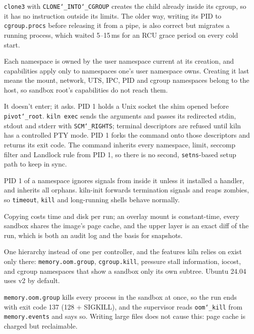 \documentclass[10pt,letterpaper]{article}
\newcommand{\code}[1]{\texttt{#1}}
\newcommand{\us}{\char`\_}
\begin{document}

{\code{clone3} with \code{CLONE\us{}INTO\us{}CGROUP} creates the child already
inside its cgroup, so it has no instruction outside its limits. The older way,
writing its PID to \code{cgroup.procs} before releasing it from a pipe, is also
correct but migrates a running process, which waited 5--15\,ms for an RCU grace
period on every cold start.}

{Each namespace is owned by the user namespace current at its creation, and
capabilities apply only to namespaces one's user namespace owns. Creating it last
means the mount, network, UTS, IPC, PID and cgroup namespaces belong to the host,
so sandbox root's capabilities do not reach them.}

\qa{How does \code{kiln exec} get into a running sandbox?}
{It doesn't enter; it asks. PID 1 holds a Unix socket the shim opened before
\code{pivot\us{}root}. \code{kiln exec} sends the arguments and passes its
redirected stdin, stdout and stderr with \code{SCM\us{}RIGHTS}; terminal
descriptors are refused until kiln has a controlled PTY mode. PID 1 forks the
command onto those descriptors and returns its exit code. The command inherits every
namespace, limit, seccomp filter and Landlock rule from PID 1, so there is no
second, \code{setns}-based setup path to keep in sync.}

{PID 1 of a namespace ignores signals from inside it unless it installed a handler,
and inherits all orphans. kiln-init forwards termination signals and reaps zombies,
so \code{timeout}, \code{kill} and long-running shells behave normally.}

{Copying costs time and disk per run; an overlay mount is constant-time, every
sandbox shares the image's page cache, and the upper layer is an exact diff of
the run, which is both an audit log and the basis for snapshots.}

{One hierarchy instead of one per controller, and the features kiln relies on
exist only there: \code{memory.oom.group}, \code{cgroup.kill}, pressure stall
information, iocost, and cgroup namespaces that show a sandbox only its own
subtree. Ubuntu 24.04 uses v2 by default.}

{\code{memory.oom.group} kills every process in the sandbox at once, so the run
ends with exit code 137 (128 + SIGKILL), and the supervisor reads
\code{oom\us{}kill} from \code{memory.events} and says so. Writing large files does
not cause this: page cache is charged but reclaimable.}
\end{document}
